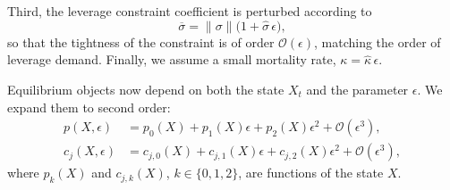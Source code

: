 Third, the leverage constraint coefficient is perturbed according to
\begin{equation}\label{eq:sig_bar-perturb}
    \overline{\sigma}=\|\sigma\|\big(1+\hat{\sigma}\,\epsilon\big),
\end{equation}
so that the tightness of the constraint is of order $\mathcal{O}(\epsilon)$, matching the order of leverage demand. Finally, we assume a small mortality rate, $\kappa=\hat{\kappa}\,\epsilon$.



Equilibrium objects now depend on both the state $X_t$ and the parameter $\epsilon$. We expand them to second order:
\begin{align}
    p(X,\epsilon) &= p_0(X) + p_1(X)\epsilon + p_2(X)\epsilon^2 + \mathcal{O}(\epsilon^3), \\
    c_j(X,\epsilon) &= c_{j,0}(X) + c_{j,1}(X)\epsilon + c_{j,2}(X)\epsilon^2 + \mathcal{O}(\epsilon^3),
\end{align}
where $p_k(X)$ and $c_{j,k}(X)$, $k\in\{0,1,2\}$, are functions of the state $X$.

